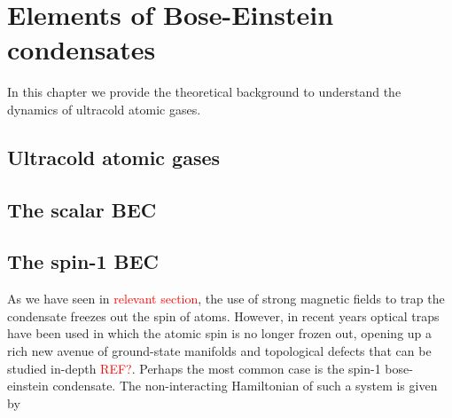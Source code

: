 \chapter{Elements of Bose-Einstein condensates}

In this chapter we provide the theoretical background to understand the 
dynamics of ultracold atomic gases.


\section{Ultracold atomic gases}


\section{The scalar BEC}

\section{The spin-1 BEC}
As we have seen in \textcolor{red}{relevant section}, the use of strong 
magnetic fields to trap the condensate freezes out the spin of atoms.
However, in recent years optical traps have been used in which the atomic 
spin is no longer frozen out, opening up a rich new avenue of ground-state
manifolds and topological defects that can be studied in-depth
\textcolor{red}{REF?}.
Perhaps the most common case is the spin-1 bose-einstein condensate.
The non-interacting Hamiltonian of such a system is given by
